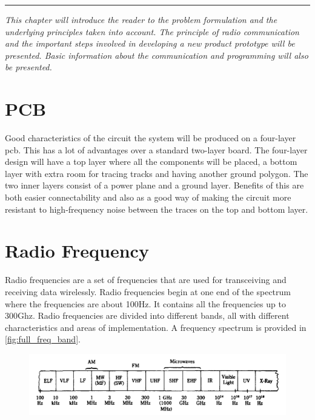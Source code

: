 \vspace{-10ex}%
\rule{\textwidth}{0.3pt}
\vspace{5ex}

\textit{
This chapter will introduce the reader to the problem formulation and the underlying principles taken into account. The principle of radio communication and the important steps involved in developing a new product prototype will be presented. Basic information about the communication and programming will also be presented. 
}
\vspace{5ex}


\section{PCB}
Good characteristics of the circuit the system will be produced on a four-layer \gls{pcb}. This has a lot of advantages over a standard two-layer board. The four-layer design will have a top layer where all the components will be placed, a bottom layer with extra room for tracing tracks and having another ground polygon. The two inner layers consist of a power plane and a ground layer. Benefits of this are both easier connectability and also as a good way of making the circuit more resistant to high-frequency noise between the traces on the top and bottom layer. 



\section{Radio Frequency}
Radio frequencies are a set of frequencies that are used for transceiving and receiving data wirelessly. Radio frequencies begin at one end of the spectrum where the frequencies are about 100Hz. It contains all the frequencies up to 300Ghz. Radio frequencies are divided into different bands, all with different characteristics and areas of implementation. A frequency spectrum is provided in \autoref{fig:full_freq_band}.

\begin{figure}[H] 
    \centering 
    \includegraphics[width=.8\linewidth]{Figures/Full_frequency_band} 
    \label{fig:full_freq_band} 
\end{figure} 

